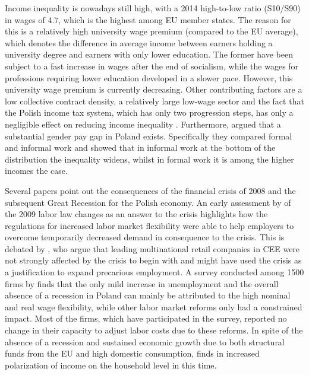 \documentclass[a4paper]{article}\usepackage[]{graphicx}\usepackage[]{color}
\begin{document}
Income inequality is nowadays still high, with a 2014 high-to-low ratio (S10/S90) in wages of 4.7, which is the highest among EU member states. The reason for this is a relatively high university wage premium (compared to the EU average), which denotes the difference in average income between earners holding a university degree and earners with only lower education. The former have been subject to a fast increase in wages after the end of socialism, while the wages for professions requiring lower education developed in a slower pace. However, this university wage premium is currently decreasing. Other contributing factors are a low collective contract density, a relatively large low-wage sector and the fact that the Polish income tax system, which has only two progression steps, has only a negligible effect on reducing income inequality \parencite{brzezinski2017}. Furthermore, \cite{ruzik2010gender} argued that a substantial gender pay gap in Poland exists. Specifically they compared formal and informal work and showed that in informal work at the bottom of the distribution the inequality widens, whilst in formal work it is among the higher incomes the case.

Several papers point out the consequences of the financial crisis of 2008 and the subsequent Great Recession for the Polish economy. An early assessment by \cite{mitrus2010} of the 2009 labor law changes as an answer to the crisis highlights how the regulations for increased labor market flexibility were able to help employers to overcome temporarily decreased demand in consequence to the crisis. This is debated by \cite{mrozowicki2013}, who argue that leading multinational retail companies in CEE were not strongly affected by the crisis to begin with and might have used the crisis as a justification to expand precarious employment. A survey conducted among 1500 firms by \cite{strzelecki2016} finds that the only mild increase in unemployment and the overall absence of a recession in Poland can mainly be attributed to the high nominal and real wage flexibility, while other labor market reforms only had a constrained impact. Most of the firms, which have participated in the survey, reported no change in their capacity to adjust labor costs due to these reforms. In spite of the absence of a recession and sustained economic growth due to both structural funds from the EU and high domestic consumption, \cite{kosny2013} finds in increased polarization of income on the household level in this time.  
\end{document}
